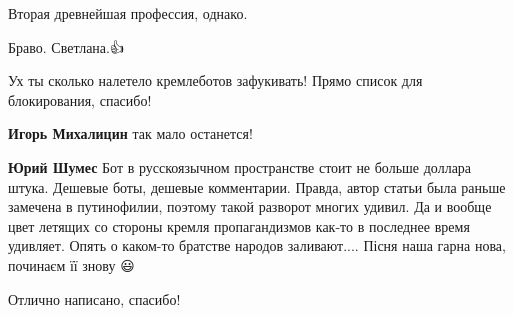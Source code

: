 \begin{itemize}
Вторая древнейшая профессия, однако.

 
Браво. Светлана.👍

 

Ух ты сколько налетело кремлеботов зафукивать! Прямо список для блокирования, спасибо!

\begin{itemize}
 
\textbf{Игорь Михалицин} так мало останется!

 
\textbf{Юрий Шумес} Бот в русскоязычном пространстве стоит не больше доллара
штука. Дешевые боты, дешевые комментарии. Правда, автор статьи была раньше
замечена в путинофилии, поэтому такой разворот многих удивил. Да и вообще цвет
летящих со стороны кремля пропагандизмов как-то в последнее время удивляет.
Опять о каком-то братстве народов заливают.... Пісня наша гарна нова, починаєм
її знову 😃
\end{itemize}

 
Отлично написано, спасибо!

 

\end{itemize}
